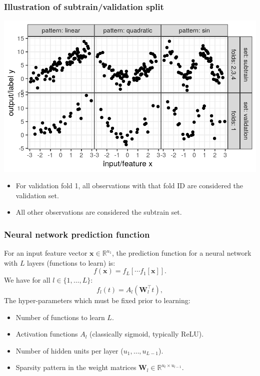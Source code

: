\documentclass{beamer}
\begin{document}
\begin{frame}
  \frametitle{Illustration of subtrain/validation split}
  \includegraphics[width=\textwidth]{figure-overfitting-data-sets}

  \begin{itemize}
  \item For validation fold 1, all observations with that fold ID are
    considered the validation set.
  \item All other observations are considered the subtrain set.
  \end{itemize}
\end{frame}

 

\begin{frame}
  \frametitle{Neural network prediction function} For an input feature
  vector $\mathbf x\in\mathbb R^{u_1}$, the prediction function for a
  neural network with $L$ layers (functions to learn) is:
\begin{equation}
  f(\mathbf x) = f_L[\cdots f_1[\mathbf x] ].
\end{equation}
  We have for all $l\in\{1,\dots,L\}$:
\begin{equation}
  f_l(t) = A_l( \mathbf W_l^\intercal t ),
\end{equation}
The hyper-parameters which must be fixed prior to learning:
\begin{itemize}
\item Number of functions to learn $L$.
\item Activation functions $A_l$ (classically sigmoid, typically ReLU).
\item Number of hidden units per layer ($u_1,\dots,u_{L-1}$).
\item Sparsity pattern in the weight matrices $\mathbf W_l\in\mathbb R^{u_{l}\times u_{l-1}}$.
\end{itemize}
\end{frame}
\end{document}

